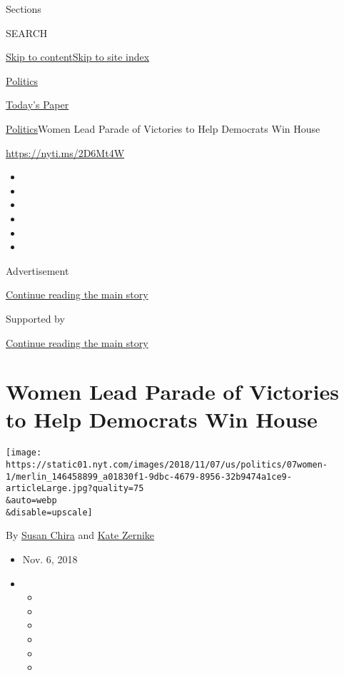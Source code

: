 Sections

SEARCH

\protect\hyperlink{site-content}{Skip to
content}\protect\hyperlink{site-index}{Skip to site index}

\href{https://www.nytimes.com/section/politics}{Politics}

\href{https://myaccount.nytimes.com/auth/login?response_type=cookie\&client_id=vi}{}

\href{https://www.nytimes.com/section/todayspaper}{Today's Paper}

\href{/section/politics}{Politics}\textbar{}Women Lead Parade of
Victories to Help Democrats Win House

\url{https://nyti.ms/2D6Mt4W}

\begin{itemize}
\item
\item
\item
\item
\item
\item
\end{itemize}

Advertisement

\protect\hyperlink{after-top}{Continue reading the main story}

Supported by

\protect\hyperlink{after-sponsor}{Continue reading the main story}

\hypertarget{women-lead-parade-of-victories-to-help-democrats-win-house}{%
\section{Women Lead Parade of Victories to Help Democrats Win
House}\label{women-lead-parade-of-victories-to-help-democrats-win-house}}

\texttt{[image: https://static01.nyt.com/images/2018/11/07/us/politics/07women-1/merlin\_146458899\_a01830f1-9dbc-4679-8956-32b9474a1ce9-articleLarge.jpg?quality=75\\\&auto=webp\\\&disable=upscale]}

By \href{https://www.nytimes.com/by/susan-chira}{Susan Chira} and
\href{https://www.nytimes.com/by/kate-zernike}{Kate Zernike}

\begin{itemize}
\item
  Nov. 6, 2018
\item
  \begin{itemize}
  \item
  \item
  \item
  \item
  \item
  \item
  \end{itemize}
\end{itemize}

